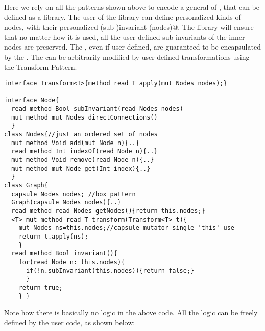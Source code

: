 

Here we rely on all the patterns shown above to encode a general \Q@Graph@
of \Q@Node@s, that can be defined as a library.
The user of the library can define personalized kinds of nodes,
with their personalized (sub-)invariant \Q@subInvariant(nodes)@.
The library will ensure that no matter how it is used, all the 
user defined sub invariants of the inner nodes are preserved.
The \Q@Node@s, even if user defined, are guaranteed to be encapsulated by the \Q@Graph@.
The \Q@Graph@ can be arbitrarily modified by user defined transformations using the Transform Pattern.
\begin{lstlisting}
interface Transform<T>{method read T apply(mut Nodes nodes);}

interface Node{
  read method Bool subInvariant(read Nodes nodes)
  mut method mut Nodes directConnections()
  }
class Nodes{//just an ordered set of nodes 
  mut method Void add(mut Node n){..}
  read method Int indexOf(read Node n){..}
  mut method Void remove(read Node n){..}
  mut method mut Node get(Int index){..}
  }
class Graph{ 
  capsule Nodes nodes; //box pattern
  Graph(capsule Nodes nodes){..}
  read method read Nodes getNodes(){return this.nodes;}
  <T> mut method read T transform(Transform<T> t){
    mut Nodes ns=this.nodes;//capsule mutator single 'this' use
    return t.apply(ns);
    }
  read method Bool invariant(){
    for(read Node n: this.nodes){
      if(!n.subInvariant(this.nodes)){return false;}
      }
    return true;
    } }
\end{lstlisting}
Note how there is basically no logic in the above code.
All the logic can be freely defined by the user code, as shown below:

